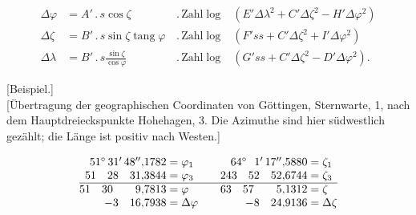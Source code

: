 \[
\begin{alignedat}{2}
\Delta\varphi&=A'\,.\,s\cos\zeta
&\,.\,\text{Zahl}\log&(E'\Delta\lambda^2+C'\Delta\zeta^2-H'\Delta\varphi^2)\\
\Delta\zeta&=B'\,.\,s\sin\zeta\operatorname{tang}\varphi
&\,.\,\text{Zahl}\log&(F'ss+C'\Delta\zeta^2+I'\Delta\varphi^2)\\
\Delta\lambda&=B'\,.\,s\frac{\sin\zeta}{\cos\varphi}
&\,.\,\text{Zahl}\log&(G'ss+C'\Delta\zeta^2-D'\Delta\varphi^2).
\end{alignedat}
\]

\begin{center}
[Beispiel.]\\[.5ex]
{[Übertragung der geographischen Coordinaten von Göttingen, Sternwarte, 1,
nach dem Hauptdreieckspunkte Hohehagen, 3. Die Azimuthe sind hier
südwestlich gezählt; die Länge ist positiv nach Westen.]}
\end{center}
\[
\begin{array}{@{}r@{\;}l@{\qquad}r@{\;}l@{}}
51^\circ\,31'\,48''{,}1782&=\varphi_1&64^\circ\phantom{0}\,1'\,17''{,}5880&=\zeta_1\\
51\quad28\quad31{,}3844&=\varphi_3&243\quad52\quad52{,}6744&=\zeta_3\\
\hline
51\quad30\qquad9{,}7813&=\varphi&63\quad57\qquad5{,}1312&=\zeta\\
-3\quad16{,}7938&=\Delta\varphi&-8\quad24{,}9136&=\Delta\zeta
\end{array}
\]

